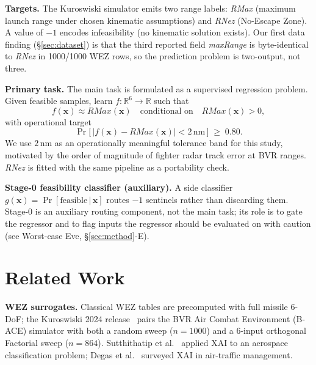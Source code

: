 \documentclass[conference]{IEEEtran}
\begin{document}
\textbf{Targets.} The Kuroswiski simulator emits two range labels: \textit{RMax} (maximum launch range under chosen kinematic assumptions) and \textit{RNez} (No-Escape Zone). A value of $-1$ encodes infeasibility (no kinematic solution exists). Our first data finding (\S\ref{sec:dataset}) is that the third reported field \textit{maxRange} is byte-identical to \textit{RNez} in 1000/1000 WEZ rows, so the prediction problem is two-output, not three.

\textbf{Primary task.} The main task is formulated as a supervised regression problem. Given feasible samples, learn $f: \mathbb{R}^6 \to \mathbb{R}$ such that
\begin{equation}
    f(\mathbf{x}) \approx RMax(\mathbf{x}) \quad \text{conditional on}\quad RMax(\mathbf{x}) > 0,
\end{equation}
with operational target
\begin{equation}
    \Pr\bigl[\,|f(\mathbf{x}) - RMax(\mathbf{x})| < 2\,\text{nm}\,\bigr] \;\geq\; 0.80.
\end{equation}
We use $2$\,nm as an operationally meaningful tolerance band for this study, motivated by the order of magnitude of fighter radar track error at BVR ranges. \textit{RNez} is fitted with the same pipeline as a portability check.

\textbf{Stage-0 feasibility classifier (auxiliary).} A side classifier $g(\mathbf{x}) = \Pr[\text{feasible}\,|\,\mathbf{x}]$ routes $-1$ sentinels rather than discarding them. Stage-0 is an auxiliary routing component, not the main task; its role is to gate the regressor and to flag inputs the regressor should be evaluated on with caution (see Worst-case Eve, \S\ref{sec:method}-E).

\section{Related Work}
\label{sec:related}
\textbf{WEZ surrogates.} Classical WEZ tables are precomputed with full missile 6-DoF; the Kuroswiski 2024 release~\cite{kuroswiski2024} pairs the BVR Air Combat Environment (B-ACE) simulator with both a random sweep ($n{=}1000$) and a 6-input orthogonal Factorial sweep ($n{=}864$). Sutthithatip et al.~\cite{sutthithatip2021} applied XAI to an aerospace classification problem; Degas et al.~\cite{degas2022} surveyed XAI in air-traffic management.
\end{document}
